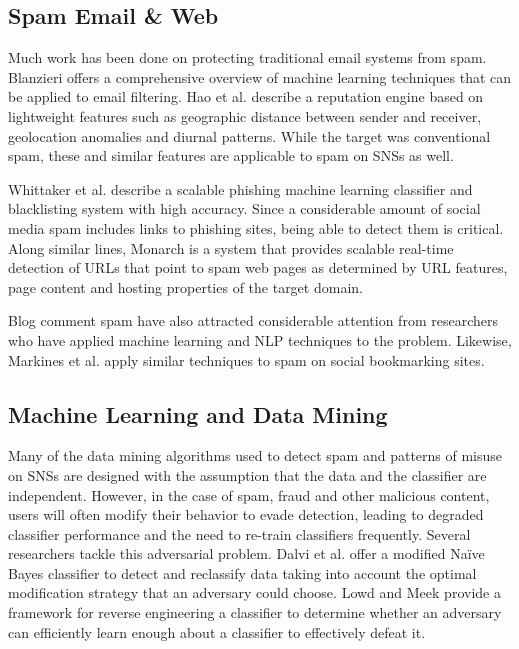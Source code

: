 \documentclass[preprint]{acm_proc_article-sp}
\begin{document}
\subsection{Spam Email \& Web}

Much work has been done on protecting traditional email systems from spam. 
Blanzieri \cite{blanzieri} offers a comprehensive overview of machine learning techniques 
that can be applied to email filtering. Hao et al. \cite{hao} describe a reputation 
engine based on lightweight features such as geographic distance between sender and 
receiver, geolocation anomalies and diurnal patterns. While the target was conventional 
spam, these and similar features are applicable to spam on SNSs as well.

Whittaker et al. \cite{whittaker} describe a scalable phishing machine learning 
classifier and blacklisting system with high accuracy. Since a considerable 
amount of social media spam includes links to phishing sites, being able to 
detect them is critical. Along similar lines, Monarch \cite{thomas} is a 
system that provides scalable real-time detection of URLs that point to spam web pages as 
determined by URL features, page content and hosting properties of the target domain.

Blog comment spam have also attracted considerable attention from researchers who 
have applied machine learning \cite{kolari, nag} and NLP \cite{mishne} techniques to the 
problem. Likewise, Markines et al. \cite{markines} apply similar techniques to spam on 
social bookmarking sites.

\subsection{Machine Learning and Data Mining}

Many of the data mining algorithms used to detect spam and patterns of misuse 
on SNSs are designed with the assumption that the data and the classifier are 
independent. However, in the case of spam, fraud and other malicious content, 
users will often modify their behavior to evade detection, leading to degraded 
classifier performance and the need to re-train classifiers frequently. Several 
researchers tackle this adversarial problem. Dalvi et al. \cite{dalvi} offer a 
modified Na\"ive Bayes classifier to detect and reclassify data taking into account 
the optimal modification strategy that an adversary could choose. Lowd and Meek \cite{lowd} 
provide a framework for reverse engineering a classifier to determine whether 
an adversary can efficiently learn enough about a classifier to effectively defeat it.
\end{document}
